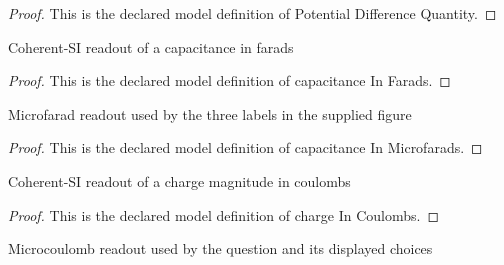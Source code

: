 \begin{proof}
  This is the declared model definition of Potential Difference Quantity.
\end{proof}
\begin{definition}
  \label{def:physics:phyx-mini-0880:phyxminiproblems-problemphyxmini0880-capacitanceinfarads}
  Coherent-SI readout of a capacitance in farads
\end{definition}
\begin{proof}
  This is the declared model definition of capacitance In Farads.
\end{proof}
\begin{definition}
  \label{def:physics:phyx-mini-0880:phyxminiproblems-problemphyxmini0880-capacitanceinmicrofarads}
  Microfarad readout used by the three labels in the supplied figure
\end{definition}
\begin{proof}
  This is the declared model definition of capacitance In Microfarads.
\end{proof}
\begin{definition}
  \label{def:physics:phyx-mini-0880:phyxminiproblems-problemphyxmini0880-chargeincoulombs}
  Coherent-SI readout of a charge magnitude in coulombs
\end{definition}
\begin{proof}
  This is the declared model definition of charge In Coulombs.
\end{proof}
\begin{definition}
  \label{def:physics:phyx-mini-0880:phyxminiproblems-problemphyxmini0880-chargeinmicrocoulombs}
  Microcoulomb readout used by the question and its displayed choices
\end{definition}
